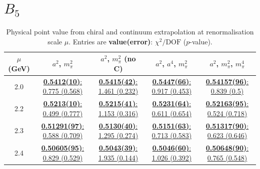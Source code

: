 \documentclass[12pt]{extarticle}
\begin{document}
\section{$B_5$}
\begin{table}[h!]
\begin{center}
\begin{tabular}{|c|c|c|c|c|}
\hline
$\mu$ (GeV) & $a^2$, $m_\pi^2$& $a^2$, $m_\pi^2$ (no C)& $a^2$, $a^4$, $m_\pi^2$& $a^2$, $m_\pi^2$, $m_\pi^4$\\
\hline
2.0& \hyperlink{TT/SUSY/a2m2_20.pdf.1}{\textbf{0.5412(10)}: 0.775 (0.568)} & \hyperlink{TT/SUSY/a2m2noC_20.pdf.1}{\textbf{0.5415(42)}: 1.461 (0.232)} & \hyperlink{TT/SUSY/a2a4m2_20.pdf.1}{\textbf{0.5447(66)}: 0.917 (0.453)} & \hyperlink{TT/SUSY/a2m2m4_20.pdf.1}{\textbf{0.54157(96)}: 0.839 (0.5)}\\
2.2& \hyperlink{TT/SUSY/a2m2_22.pdf.1}{\textbf{0.5213(10)}: 0.499 (0.777)} & \hyperlink{TT/SUSY/a2m2noC_22.pdf.1}{\textbf{0.5215(41)}: 1.153 (0.316)} & \hyperlink{TT/SUSY/a2a4m2_22.pdf.1}{\textbf{0.5231(64)}: 0.611 (0.654)} & \hyperlink{TT/SUSY/a2m2m4_22.pdf.1}{\textbf{0.52163(95)}: 0.524 (0.718)}\\
2.3& \hyperlink{TT/SUSY/a2m2_23.pdf.1}{\textbf{0.51291(97)}: 0.588 (0.709)} & \hyperlink{TT/SUSY/a2m2noC_23.pdf.1}{\textbf{0.5130(40)}: 1.295 (0.274)} & \hyperlink{TT/SUSY/a2a4m2_23.pdf.1}{\textbf{0.5151(63)}: 0.713 (0.583)} & \hyperlink{TT/SUSY/a2m2m4_23.pdf.1}{\textbf{0.51317(90)}: 0.623 (0.646)}\\
2.4& \hyperlink{TT/SUSY/a2m2_24.pdf.1}{\textbf{0.50605(95)}: 0.829 (0.529)} & \hyperlink{TT/SUSY/a2m2noC_24.pdf.1}{\textbf{0.5043(39)}: 1.935 (0.144)} & \hyperlink{TT/SUSY/a2a4m2_24.pdf.1}{\textbf{0.5046(60)}: 1.026 (0.392)} & \hyperlink{TT/SUSY/a2m2m4_24.pdf.1}{\textbf{0.50648(90)}: 0.765 (0.548)}\\
\hline
\end{tabular}
\caption{Physical point value from chiral and continuum extrapolation at renormalisation scale $\mu$. Entries are \textbf{value(error)}: $\chi^2/\text{DOF}$ ($p$-value).}
\end{center}
\end{table}
\end{document}
